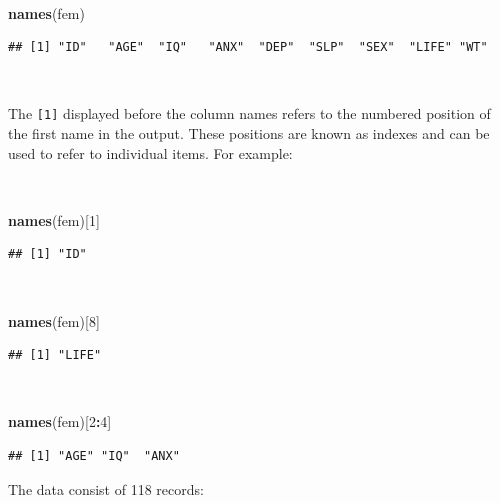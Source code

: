 \documentclass[12pt,a4paper]{book}
\newenvironment{Shaded}{\begin{snugshade}}{\end{snugshade}}
\newcommand{\KeywordTok}[1]{\textcolor[rgb]{0.13,0.29,0.53}{\textbf{#1}}}
\newcommand{\DecValTok}[1]{\textcolor[rgb]{0.00,0.00,0.81}{#1}}
\newcommand{\OperatorTok}[1]{\textcolor[rgb]{0.81,0.36,0.00}{\textbf{#1}}}
\newcommand{\NormalTok}[1]{#1}
\theoremstyle{definition}
\theoremstyle{definition}
\theoremstyle{definition}
\theoremstyle{remark}
\begin{document}
~

\begin{Shaded}
\begin{Highlighting}[]
\KeywordTok{names}\NormalTok{(fem)}
\end{Highlighting}
\end{Shaded}

\begin{verbatim}
## [1] "ID"   "AGE"  "IQ"   "ANX"  "DEP"  "SLP"  "SEX"  "LIFE" "WT"
\end{verbatim}

~

The \texttt{{[}1{]}} displayed before the column names refers to the
numbered position of the first name in the output. These positions are
known as indexes and can be used to refer to individual items. For
example:

~

\begin{Shaded}
\begin{Highlighting}[]
\KeywordTok{names}\NormalTok{(fem)[}\DecValTok{1}\NormalTok{]}
\end{Highlighting}
\end{Shaded}

\begin{verbatim}
## [1] "ID"
\end{verbatim}

~

\begin{Shaded}
\begin{Highlighting}[]
\KeywordTok{names}\NormalTok{(fem)[}\DecValTok{8}\NormalTok{]}
\end{Highlighting}
\end{Shaded}

\begin{verbatim}
## [1] "LIFE"
\end{verbatim}

~

\begin{Shaded}
\begin{Highlighting}[]
\KeywordTok{names}\NormalTok{(fem)[}\DecValTok{2}\OperatorTok{:}\DecValTok{4}\NormalTok{]}
\end{Highlighting}
\end{Shaded}

\begin{verbatim}
## [1] "AGE" "IQ"  "ANX"
\end{verbatim}

\newpage

The data consist of 118 records:
\end{document}
